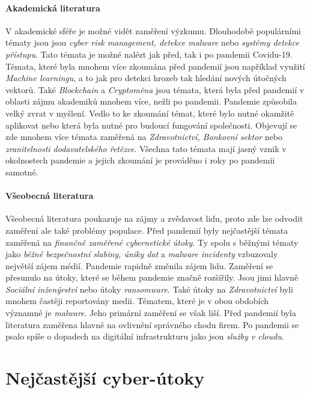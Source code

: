 \paragraph{Akademická literatura}
V akademické sféře je možné vidět zaměření výzkumu.
Dlouhodobě populárními tématy jsou jsou \textit{cyber risk management, detekce malware} nebo \textit{systémy detekce přístupu}.\cite{KUMAR2022102821}
Tato témata je možné nalézt jak před, tak i po pandemii Covidu-19.
Témata, které byla mnohem více zkoumána před pandemií jsou například využití \textit{Machine learningu}, a to jak pro detekci hrozeb tak hledání nových útočných vektorů.
Také \textit{Blockchain} a \textit{Cryptoměna} jsou témata, která byla před pandemií v oblasti zájmu akademiků mnohem více, nežli po pandemii.\cite{KUMAR2022102821}
Pandemie způsobila velký zvrat v myšlení.
Vedlo to ke zkoumání témat, které bylo nutné okamžitě aplikovat nebo která byla nutné pro budoucí fungování společnosti.
Objevují se zde mnohem více témata zaměřená na \textit{Zdravotnictví, Bankovní sektor} nebo \textit{zranitelnosti dodavatelského řetězce}.\cite{KUMAR2022102821}
Všechna tato témata mají jasný vznik v okolnostech pandemie a jejich zkoumání je prováděno i roky po pandemii samotné.

\paragraph{Všeobecná literatura}
Všeobecná literatura poukazuje na zájmy a zvědavost lidu, proto zde lze odvodit zaměření ale také problémy populace.
Před pandemií byly nejčastější témata zaměřená na \textit{finančně zaměřené cybernetické útoky}.
Ty spolu s běžnými tématy jako \textit{běžné bezpečnostní slabiny, úniky dat} a \textit{malware incidenty} vzbuzovaly největší zájem médií.\cite{KUMAR2022102821}
Pandemie rapidně změnila zájem lidu.
Zaměření se přesunulo na útoky, které se během pandemie značně rozšířily.
Jsou jimi hlavně \textit{Sociální inženýrství} nebo útoky \textit{ransomware}.
Také útoky na \textit{Zdravotnictví} byli mnohem častěji reportovány medii.
Tématem, které je v obou obdobích významné je \textit{malware}.
Jeho primární zaměření se však liší.
Před pandemií byla literatura zaměřena hlavně na ovlivnění správného chodu firem.
Po pandemii se psalo spíše o dopadech na digitální infrastrukturu jako jsou \textit{služby v cloudu}.

\section{Nejčastější cyber-útoky}
